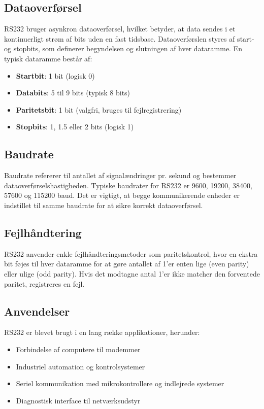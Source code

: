 \subsection{Dataoverførsel}
RS232 bruger asynkron dataoverførsel, hvilket betyder, at data sendes i et kontinuerligt strøm af bits uden en fast tidsbase. Dataoverførslen styres af start- og stopbits, som definerer begyndelsen og slutningen af hver dataramme. En typisk dataramme består af:
\begin{itemize}
	\item \textbf{Startbit}: 1 bit (logisk 0)
	\item \textbf{Databits}: 5 til 9 bits (typisk 8 bits)
	\item \textbf{Paritetsbit}: 1 bit (valgfri, bruges til fejlregistrering)
	\item \textbf{Stopbits}: 1, 1.5 eller 2 bits (logisk 1)
\end{itemize}

\subsection{Baudrate}
Baudrate refererer til antallet af signalændringer pr. sekund og bestemmer dataoverførselshastigheden. Typiske baudrater for RS232 er 9600, 19200, 38400, 57600 og 115200 baud. Det er vigtigt, at begge kommunikerende enheder er indstillet til samme baudrate for at sikre korrekt dataoverførsel.

\subsection{Fejlhåndtering}
RS232 anvender enkle fejlhåndteringsmetoder som paritetskontrol, hvor en ekstra bit føjes til hver dataramme for at gøre antallet af 1'er enten lige (even parity) eller ulige (odd parity). Hvis det modtagne antal 1'er ikke matcher den forventede paritet, registreres en fejl.

\subsection{Anvendelser}
RS232 er blevet brugt i en lang række applikationer, herunder:

\begin{itemize}
	\item Forbindelse af computere til modemmer
	\item Industriel automation og kontrolsystemer
	\item Seriel kommunikation med mikrokontrollere og indlejrede systemer
	\item Diagnostisk interface til netværksudstyr
\end{itemize}

